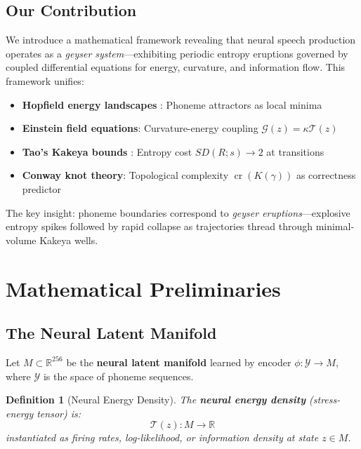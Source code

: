 \documentclass[12pt]{article}
\newtheorem{definition}{Definition}
\begin{document}
\subsection{Our Contribution}

We introduce a mathematical framework revealing that neural speech production operates as a \emph{geyser system}---exhibiting periodic entropy eruptions governed by coupled differential equations for energy, curvature, and information flow. This framework unifies:

\begin{itemize}
\item \textbf{Hopfield energy landscapes} \cite{hopfield1982}: Phoneme attractors as local minima
\item \textbf{Einstein field equations}: Curvature-energy coupling $\mathcal{G}(z) = \kappa \mathcal{T}(z)$
\item \textbf{Tao's Kakeya bounds} \cite{tao2024}: Entropy cost $SD(R;s) \to 2$ at transitions
\item \textbf{Conway knot theory}: Topological complexity $\operatorname{cr}(K(\gamma))$ as correctness predictor
\end{itemize}

The key insight: phoneme boundaries correspond to \emph{geyser eruptions}---explosive entropy spikes followed by rapid collapse as trajectories thread through minimal-volume Kakeya wells.

\section{Mathematical Preliminaries}

\subsection{The Neural Latent Manifold}

Let $M \subset \mathbb{R}^{256}$ be the \textbf{neural latent manifold} learned by encoder $\phi: \mathcal{Y} \to M$, where $\mathcal{Y}$ is the space of phoneme sequences.

\begin{definition}[Neural Energy Density]
The \textbf{neural energy density} (stress-energy tensor) is:
\begin{equation}
\mathcal{T}(z): M \to \mathbb{R}
\end{equation}
instantiated as firing rates, log-likelihood, or information density at state $z \in M$.
\end{definition}
\end{document}
